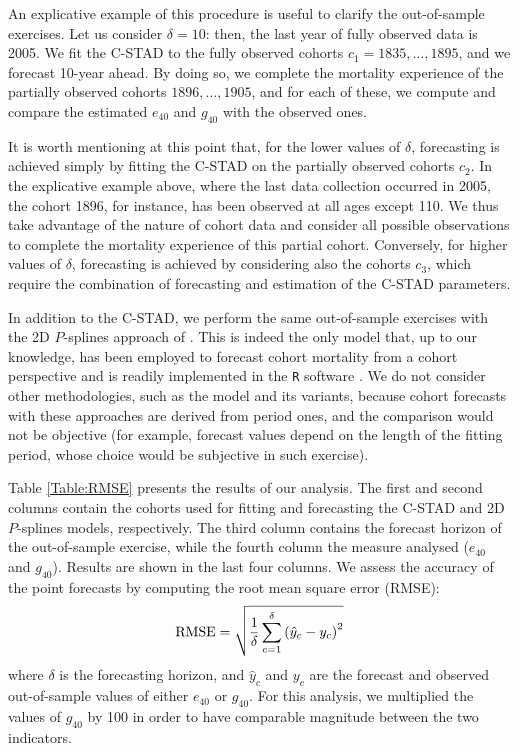 \documentclass[11pt, a4paper]{article}
\begin{document}
An explicative example of this procedure is useful to clarify the out-of-sample exercises. Let us consider $\delta=10$: then, the last year of fully observed data is 2005. We fit the C-STAD to the fully observed cohorts $c_1=1835,\ldots,1895$, and we forecast 10-year ahead. By doing so, we complete the mortality experience of the partially observed cohorts $1896,\ldots,1905$, and for each of these, we compute and compare the estimated $e_{40}$ and $g_{40}$ with the observed ones. 

It is worth mentioning at this point that, for the lower values of $\delta$, forecasting is achieved simply by fitting the C-STAD on the partially observed cohorts $c_2$. In the explicative example above, where the last data collection occurred in 2005, the cohort 1896, for instance, has been observed at all ages except 110. We thus take advantage of the nature of cohort data and consider all possible observations to complete the mortality experience of this partial cohort.  Conversely, for higher values of $\delta$, forecasting is achieved by considering also the cohorts $c_3$, which require the combination of forecasting and estimation of the C-STAD parameters. 

In addition to the C-STAD, we perform the same out-of-sample exercises with the 2D $P$-splines approach of \cite{currie2004smoothing}. This is indeed the only model that, up to our knowledge, has been employed to forecast cohort mortality from a cohort perspective \citep{cmi2007stochastic} and is readily implemented in the \texttt{R} software \cite[in the \texttt{MortalitySmooth} package,][]{camarda2012mortalitysmooth}. We do not consider other methodologies, such as the \cite{lee1992modeling} model and its variants, because cohort forecasts with these approaches are derived from period ones, and the comparison would not be objective (for example, forecast values depend on the length of the fitting period, whose choice would be subjective in such exercise).  

Table \ref{Table:RMSE} presents the results of our analysis. The first and second columns contain the cohorts used for fitting and forecasting the C-STAD and 2D $P$-splines models, respectively. The third column contains the forecast horizon of the out-of-sample exercise, while the fourth column the measure analysed ($e_{40}$ and $g_{40}$). Results are shown in the last four columns. We assess the accuracy of the point forecasts by computing the root mean square error (RMSE):
%
\begin{equation}\label{Eq:RMSE}
\mathrm{RMSE}=\sqrt{\frac{1}{\delta} \sum_{c=1}^{\delta} \left(\hat{y}_c-y_c\right)^2} \notag
\end{equation} 
%
where $\delta$ is the forecasting horizon, and $\hat{y}_c$ and $y_c$ are the forecast and observed out-of-sample values of either $e_{40}$ or $g_{40}$. For this analysis, we multiplied the values of $g_{40}$ by 100 in order to have comparable magnitude between the two indicators. \par 
\end{document}
